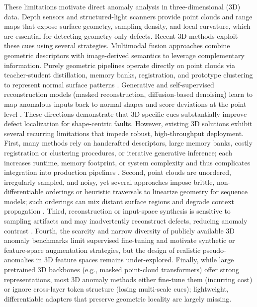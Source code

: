 These limitations motivate direct anomaly analysis in three-dimensional (3D) data. Depth sensors and structured-light scanners provide point clouds and range maps that expose surface geometry, sampling density, and local curvature, which are essential for detecting geometry-only defects. Recent 3D methods exploit these cues using several strategies. Multimodal fusion approaches combine geometric descriptors with image-derived semantics to leverage complementary information\cite{cao2024complementary,wang2023multimodal,rudolph2023asymmetric}. Purely geometric pipelines operate directly on point clouds via teacher-student distillation, memory banks, registration, and prototype clustering to represent normal surface patterns \cite{bergmann2023anomaly,liu2023real3d,zhu2024towards}. Generative and self-supervised reconstruction models (masked reconstruction, diffusion-based denoising) learn to map anomalous inputs back to normal shapes and score deviations at the point level \cite{li2024towards,zhou2024r3d}. These directions demonstrate that 3D-specific cues substantially improve defect localization for shape-centric faults. However, existing 3D solutions exhibit several recurring limitations that impede robust, high-throughput deployment. First, many methods rely on handcrafted descriptors, large memory banks, costly registration or clustering procedures, or iterative generative inference; each increases runtime, memory footprint, or system complexity and thus complicates integration into production pipelines \cite{liu2023real3d,zhu2024towards}. Second, point clouds are unordered, irregularly sampled, and noisy, yet several approaches impose brittle, non-differentiable orderings or heuristic traversals to linearize geometry for sequence models; such orderings can mix distant surface regions and degrade context propagation \cite{liang2024pointmamba}. Third, reconstruction or input-space synthesis is sensitive to sampling artifacts and may inadvertently reconstruct defects, reducing anomaly contrast \cite{li2024towards,zhou2024r3d}. Fourth, the scarcity and narrow diversity of publicly available 3D anomaly benchmarks limit supervised fine-tuning and motivate synthetic or feature-space augmentation strategies, but the design of realistic pseudo-anomalies in 3D feature spaces remains under-explored. Finally, while large pretrained 3D backbones (e.g., masked point-cloud transformers) offer strong representations, most 3D anomaly methods either fine-tune them (incurring cost) or ignore cross-layer token structure (losing multi-scale cues); lightweight, differentiable adapters that preserve geometric locality are largely missing.

